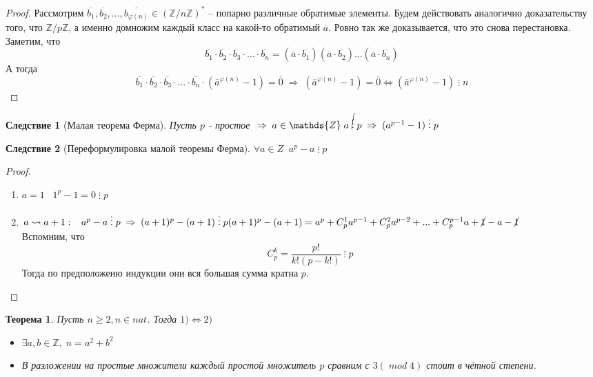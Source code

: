 \documentclass[12pt, a4paper]{article}
\newcommand{\lra}{\Leftrightarrow}
\newcommand{\ra}{\;\Rightarrow\;}
\newcommand{\Z}{\mathds{Z}}
\newcommand{\bo}{\geqslant}
\newcommand{\cl}[1]{\overline{#1}}
\newcommand{\nd}{\;\cancel{\vdots}\;}
\newcommand{\de}{\;\vdots\;}
\theoremstyle{plain}
\newtheorem*{Th*}{Теорема}
\newtheorem*{Corollary*}{Следствие}
\theoremstyle{definition}
\begin{document}
\begin{proof}
    Рассмотрим $\cl{b_1},\cl{b_2},...,\cl{b_{\varphi(n)}}\in (\Z/n\Z)^{*}$ -- попарно различные обратимые элементы.
    Будем действовать аналогично доказательству того, что $\Z/p\Z$, а именно домножим каждый класс на какой-то обратимый $\cl{a}$. Ровно так же доказывается, что это снова перестановка.
    Заметим, что \[\cl{b_1}\cdot\cl{b_2}\cdot\cl{b_3}\cdot...\cdot\cl{b_n} = (\cl{a}\cdot\cl{b_1})(\cl{a}\cdot\cl{b_2})...(\cl{a}\cdot\cl{b_n})\]
    А тогда \[\cl{b_1}\cdot\cl{b_2}\cdot\cl{b_3}\cdot...\cdot\cl{b_n}\cdot ({\cl{a}}^{\varphi(n)} - 1) = \cl{0}\ra({\cl{a}}^{\varphi(n)} - 1) = \cl{0} \lra (\cl{a}^{\varphi(n)} - 1)\;\vdots\; n \]
\end{proof}
\begin{Corollary*}[Малая теорема Ферма]
    Пусть $p$ - простое $\ra a\in\Z\; a\nd p\ra (a^{p-1} - 1)\;\vdots \;p $
\end{Corollary*}
\begin{Corollary*}[Переформулировка малой теоремы Ферма]
    $\forall a\in Z\;\; a^p-a\;\vdots\; p$
\end{Corollary*}
\begin{proof}


\begin{enumerate}
    \item $a=1\;\;\; 1^{p}-1 = 0\;\vdots\; p$
    \item $a\leadsto a+1:\;\;\;     a^p-a\;\vdots\; p\ra (a+1)^p - (a+1)\;\vdots\; p\\
    (a+1)^p - (a+1) = a^p +C_{p}^{1}a^{p-1}+C_{p}^{2}a^{p-2}+...+C_{p}^{p-1}a+\cancel{1}-a-\cancel{1}$\\
    Вспомним, что \[C_{p}^{k}  = \frac{p!}{k!(p-k!)}\de p\]
    Тогда по предположеию индукции они вся большая сумма кратна $p$.
\end{enumerate}
\end{proof}
\begin{Th*}
    Пусть $n\bo 2, n\in nat$. Тогда $1)\lra2)$
    \begin{itemize}
        \item $\exists a,b\in \Z, \; n=a^2+b^2$
        \item В разложении на простые множители каждый простой множитель $p$ сравним с $3(\;mod\; 4)$ стоит в чётной степени.
    \end{itemize} 
\end{Th*}
\end{document}
